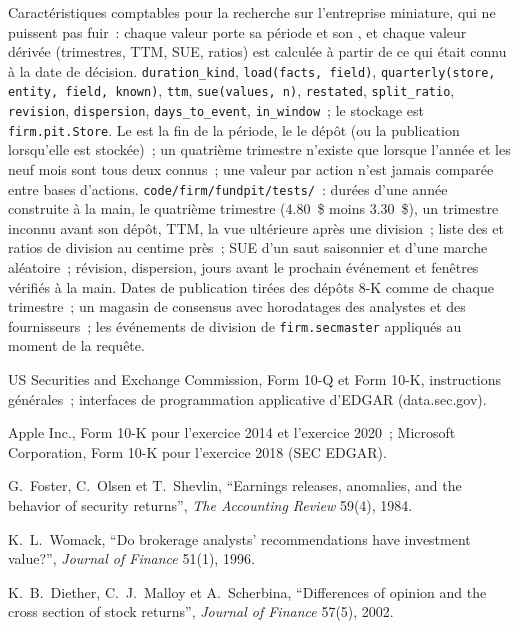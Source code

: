 \begin{build}
 Caractéristiques comptables pour la recherche sur l'entreprise miniature, qui ne puissent pas fuir~: chaque valeur porte sa période et son , et chaque valeur dérivée (trimestres, TTM, SUE, ratios) est calculée à partir de ce qui était connu à la date de décision.
 \texttt{duration\_kind}, \texttt{load(facts, field)}, \texttt{quarterly(store, entity, field, known)}, \texttt{ttm},
\texttt{sue(values, n)}, \texttt{restated}, \texttt{split\_ratio}, \texttt{revision}, \texttt{dispersion}, \texttt{days\_to\_event},
\texttt{in\_window}~; le stockage est \texttt{firm.pit.Store}.
 Le  est la fin de la période, le  le dépôt (ou la publication lorsqu'elle est stockée)~; un quatrième trimestre n'existe que lorsque
l'année et les neuf mois sont tous deux connus~; une valeur par action n'est jamais comparée entre bases d'actions.
 \texttt{code/firm/fundpit/tests/}~: durées d'une année construite à la main, le quatrième trimestre (4.80~\$ moins 3.30~\$), un trimestre
inconnu avant son dépôt, TTM, la vue ultérieure après une division~; liste des  et ratios de division au centime près~; SUE d'un saut saisonnier et d'une
marche aléatoire~; révision, dispersion, jours avant le prochain événement et fenêtres vérifiés à la main.
 Dates de publication tirées des dépôts 8-K comme  de chaque trimestre~; un magasin de consensus avec horodatages des analystes et des fournisseurs~;
les événements de division de \texttt{firm.secmaster} appliqués au moment de la requête.
\end{build}

\begin{omsources}
\item US Securities and Exchange Commission, Form 10-Q et Form 10-K, instructions générales~; interfaces de programmation applicative d'EDGAR
(data.sec.gov).
\item Apple Inc., Form 10-K pour l'exercice 2014 et l'exercice 2020~; Microsoft Corporation, Form 10-K pour l'exercice 2018 (SEC EDGAR).
\item G.~Foster, C.~Olsen et T.~Shevlin, ``Earnings releases, anomalies, and the behavior of security returns'', \emph{The Accounting Review}
59(4), 1984.
\item K.~L.~Womack, ``Do brokerage analysts' recommendations have investment value?'', \emph{Journal of Finance} 51(1), 1996.
\item K.~B.~Diether, C.~J.~Malloy et A.~Scherbina, ``Differences of opinion and the cross section of stock returns'', \emph{Journal of
Finance} 57(5), 2002.
\end{omsources}

